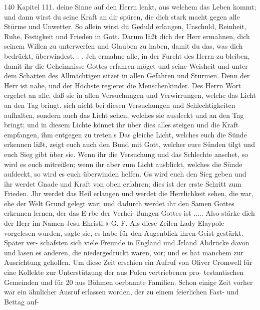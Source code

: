 140 Kapitel 111.
deine Sinne auf den Herrn lenkt, aus welchem das Leben
kommt; und dann wirst du seine Kraft an dir spüren, die dich
stark macht gegen alle Stürme und Unwetter. So allein wirst
du Geduld erlangen, Unschuld, Reinheit, Ruhe, Festigkeit und
Frieden in Gott. Darum läßt dich der Herr ermahnen, dich
seinem Willen zu unterwerfen und Glauben zu haben, damit du
das, was dich bedrückt, überwindest. .   . Jch ermahne alle,
in der Furcht des Herrn zu bleiben, damit ihr die Geheimnisse
Gottes erfahren möget und seine Weisheit und unter dem Schatten
des Allmächtigen sitzet in allen Gefahren und Stürmen. Denn
der Herr ist nahe, und der Höchste regieret die Menschenkinder.
Des Herrn Wort ergehet an alle, daß sie in allen Versuchungen
und Verwirrungen, welche das Licht an den Tag bringt, sich nicht
bei diesen Versuchungen und Schlechtigkeiten aufhalten, sondern
auch das Licht sehen, welches sie ausdeckt und an den Tag
bringt; und in diesem Lichte könnet ihr über dies alles steigen
und die Kraft empfangen, ihm entgegen zu treten.s Das gleiche
Licht, welches euch die Sünde erkennen läßt, zeigt euch auch den
Bund mit Gott, welcher eure Sünden tilgt und euch Sieg gibt
über sie.   Wenn ihr die Versuchung und das Schlechte ansehet,
so wird es euch mitreißen; wenn ihr aber zum Licht ausblickt,
welches die Sünde aufdeckt, so wird es euch überwinden helfen.
Gs wird euch den Sieg geben und ihr werdet Gnade und Kraft
von oben erfahren; dies ist der erste Schritt zum Frieden. Jhr
werdet das Heil erlangen und werdet die Herrlichkeit sehen, die
war, ehe der Welt Grund gelegt war; und dadurch werdet ihr
den Samen Gottes erkennen lernen, der das E-rbe der Verhei-
ßungen Gottes ist ..... Also stärke dich der Herr im Namen
Jesu Ehristi.« G. F.
Als diese Zeilen Lady Elaypole vorgelesen wurden, sagte sie,
es habe für den Augenblick ihren Geist gestärkt. Später ver-
schafsten sich viele Freunde in England und Jrland Abdrücke
davon und lasen es anderen, die niedergedrückt waren, vor; und
es hat manchem zur Ausrichtung geholfen.
Um diese Zeit erschien ein Aufruf von Oliver Cromwell für
eine Kollekte zur Unterstützung der aus Polen vertriebenen pro-
testantischen Gemeinden und für 20 aus Böhmen oerbannte
Familien. Schon einige Zeit vorher war ein ähnlicher Ausruf
erlassen worden, der zu einem feierlichen Fast- und Bettag auf-


